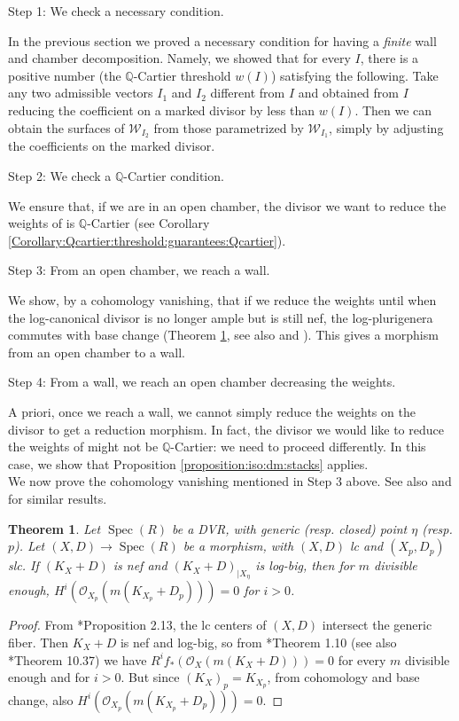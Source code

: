 \documentclass[11pt]{amsart}
\newcommand{\cE}{\mathcal{W}}
\newcommand{\cO}{\mathcal{O}}
\newcommand{\spec}{\operatorname{Spec}}
\newtheorem{Teo}[theorem]{Theorem}
\theoremstyle{definition}
\begin{document}
\begin{bf}Step 1: We check a necessary condition.\end{bf} In the previous section we proved a necessary condition for having a \emph{finite} wall and chamber decomposition. Namely, we showed that for every $I$, there is a positive number (the $\mathbb{Q}$-Cartier threshold $w(I)$) satisfying the following. Take any two admissible vectors $I_1$ and $I_2$ different from $I$ and obtained from $I$ reducing the coefficient on a marked divisor by less than $w(I)$. Then we can obtain the surfaces of $\cE_{I_2}$ from those parametrized by $\cE_{I_1}$, simply by adjusting the coefficients on the marked divisor.

\begin{bf}Step 2: We check a $\mathbb{Q}$-Cartier condition. \end{bf}We ensure that, if we are in an open chamber, the divisor we want to reduce the weights of is $\mathbb{Q}$-Cartier (see Corollary \ref{Corollary:Qcartier:threshold:guarantees:Qcartier}).


\begin{bf}Step 3: From an open chamber, we reach a wall.\end{bf} We show, by a cohomology vanishing, that if we reduce the weights until when the log-canonical divisor is no longer ample but is still nef, the log-plurigenera commutes with base change (Theorem \ref{Teo:cohom:vanishing}, see also
\cite{kollar2018logs} and \cite{kollar2018log}). This gives a morphism from an open chamber to a wall.

\begin{bf}Step 4: From a wall, we reach an open chamber decreasing the weights.\end{bf} A priori, once we reach a wall, we cannot simply reduce the weights on the divisor to get a reduction morphism. In fact, the divisor we would like to reduce the weights of might not be $\mathbb{Q}$-Cartier: we need to proceed differently. In this case, we show that Proposition \ref{proposition:iso:dm:stacks} applies.
\\

We now prove the cohomology vanishing mentioned in Step 3 above. See also
\cite{kollar2018logs} and \cite{kollar2018log} for similar results.
\begin{Teo}\label{Teo:cohom:vanishing}
 Let $\spec(R)$ be a DVR, with generic (resp. closed) point $\eta$ (resp. $p$). Let $(X,D) \to \spec(R)$ be a morphism, with $(X,D)$ lc and
 $(X_p,D_p)$ slc. If $(K_X+D)$ is nef and $(K_X+D)_{|X_\eta}$ is log-big, then for $m$ divisible enough, $H^i(\cO_{X_p}(m(K_{X_p}+D_p)))=0$ for $i>0$.
\end{Teo}
\begin{proof}
From \cite{kollarbook}*{Proposition 2.13}, the lc centers of $(X,D)$ intersect the generic fiber. Then $K_X+D$ is nef and log-big, so
from \cite{Fuj-vanishing}*{Theorem 1.10} (see also \cite{Kollarsing}*{Theorem 10.37}) we have $R^if_*(\cO_X(m(K_X+D)))=0$
for every $m$ divisible enough and for $i>0$. But since $(K_X)_{p}=K_{X_p}$,
from cohomology and base change, also
$H^i(\cO_{X_p}(m(K_{X_p}+D_p)))=0$.
\end{proof}
\end{document}

